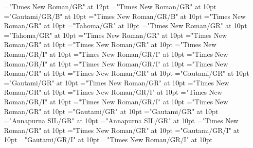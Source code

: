 \documentclass[a4paper]{article}
\begin{document}
\font{}="Times New Roman/GR" at 12pt
\font\entryletData="Times New Roman/GR" at 10pt
\font\headwordggoTeluINentryletData="Gautami/GR/B" at 10pt
\font\spanenheadwordggoTeluINentryletData="Times New Roman/GR/B" at 10pt
\font\pronunciationsentryletData="Times New Roman/GR" at 10pt
\font\pronunciationggofonipaxemicpronunciationsentryletData="Tahoma/GR" at 10pt
\font\spanenpronunciationggofonipaxemicpronunciationsentryletData="Times New Roman/GR" at 10pt
\font\spanggofonipaxemicpronunciationggofonipaxemicpronunciationsentryletData="Tahoma/GR" at 10pt
\font\spanenpronunciationsentryletData="Times New Roman/GR" at 10pt
\font\sensesentryletData="Times New Roman/GR" at 10pt
\font\sensesensesentryletData="Times New Roman/GR" at 10pt
\font\grammaticalinfosensesensesentryletData="Times New Roman/GR/I" at 10pt
\font\partofspeechengrammaticalinfosensesensesentryletData="Times New Roman/GR/I" at 10pt
\font\spanenpartofspeechengrammaticalinfosensesensesentryletData="Times New Roman/GR/I" at 10pt
\font\spanengrammaticalinfosensesensesentryletData="Times New Roman/GR/I" at 10pt
\font{}="Times New Roman/GR" at 10pt
\font\spanendefinitionensensesensesentryletData="Times New Roman/GR" at 10pt
\font\LexSensepublishStemGlossPubLdtesensesensesentryletData="Gautami/GR" at 10pt
\font\spanteLexSensepublishStemGlossPubLdtesensesensesentryletData="Gautami/GR" at 10pt
\font\spanenLexSensepublishStemGlossPubLdtesensesensesentryletData="Times New Roman/GR" at 10pt
\font\spanensensesentryletData="Times New Roman/GR" at 10pt
\font\grammaticalinfoentryletData="Times New Roman/GR/I" at 10pt
\font\partofspeechengrammaticalinfoentryletData="Times New Roman/GR/I" at 10pt
\font\spanenpartofspeechengrammaticalinfoentryletData="Times New Roman/GR/I" at 10pt
\font\xsensenumbersensesensesentryletData="Times New Roman/GR" at 10pt
\font\xitemteLexSensepublishStemGlossPubLdtesensesensesentryletData="Gautami/GR" at 10pt
\font\spantexitemteLexSensepublishStemGlossPubLdtesensesensesentryletData="Gautami/GR" at 10pt
\font\xitemhiLexSensepublishStemGlossPubLdtesensesensesentryletData="Annapurna SIL/GR" at 10pt
\font\spanhixitemhiLexSensepublishStemGlossPubLdtesensesensesentryletData="Annapurna SIL/GR" at 10pt
\font\examplessensesensesentryletData="Times New Roman/GR" at 10pt
\font\xitemexamplessensesensesentryletData="Times New Roman/GR" at 10pt
\font\exampleggoTeluINxitemexamplessensesensesentryletData="Gautami/GR/I" at 10pt
\font\spanggoTeluINexampleggoTeluINxitemexamplessensesensesentryletData="Gautami/GR/I" at 10pt
\font\spanenexampleggoTeluINxitemexamplessensesensesentryletData="Times New Roman/GR/I" at 10pt
\end{document}
